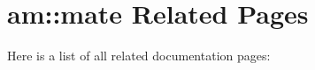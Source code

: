 \section{am::mate Related Pages}
Here is a list of all related documentation pages:\begin{CompactList}
\item {}

\end{CompactList}
